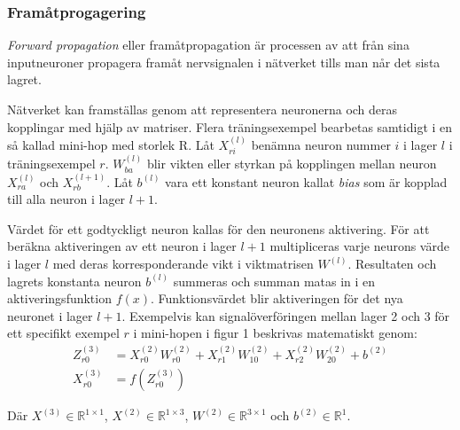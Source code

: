 \documentclass[a4paper,11pt,twoside]{article}
\begin{document}
\subsubsection{Framåtprogagering}
\textit{Forward propagation} eller framåtpropagation är processen av att från sina inputneuroner propagera framåt nervsignalen i nätverket tills man når det sista lagret. \cite{cs231n} \cite{wikiStanford}

Nätverket kan framställas genom att representera neuronerna och deras kopplingar med hjälp av matriser. Flera träningsexempel bearbetas samtidigt i en så kallad mini-hop med storlek R. Låt $X_{ri}^{(l)}$ benämna neuron nummer $i$ i lager $l$ i träningsexempel $r$. $W_{ba}^{(l)}$ blir vikten eller styrkan på kopplingen mellan neuron $X_{ra}^{(l)}$ och $X_{rb}^{(l+1)}$. Låt $b^{(l)}$ vara ett konstant neuron kallat \textit{bias} som är kopplad till alla neuron i lager $l+1$.  \cite{cs231n} \cite{wikiStanford}

Värdet för ett godtyckligt neuron kallas för den neuronens aktivering. För att beräkna aktiveringen av ett neuron i lager $l+1$ multipliceras varje neurons värde i lager $l$ med deras korresponderande vikt i viktmatrisen $W^{(l)}$. Resultaten och lagrets konstanta neuron $b^{(l)}$ summeras och summan matas in i en aktiveringsfunktion $f(x)$. Funktionsvärdet blir aktiveringen för det nya neuronet i lager $l+1$. Exempelvis kan signalöverföringen mellan lager 2 och 3 för ett specifikt exempel $r$ i mini-hopen i figur 1 beskrivas matematiskt genom: \cite{cs231n} \cite{wikiStanford}
\begin{align}
Z_{r0}^{(3)} & = X_{r0}^{(2)}W_{r0}^{(2)} + X_{r1}^{(2)}W_{10}^{(2)} + X_{r2}^{(2)}W_{20}^{(2)} + b^{(2)} \\
X_{r0}^{(3)} & = f(Z_{r0}^{(3)})
\end{align}

Där $X^{(3)} \in \mathbb{R}^{1 \times 1}$, $X^{(2)} \in \mathbb{R}^{1 \times 3}$, $W^{(2)} \in \mathbb{R}^{3 \times 1}$ och $b^{(2)} \in \mathbb{R}^{1}$.
\end{document}
